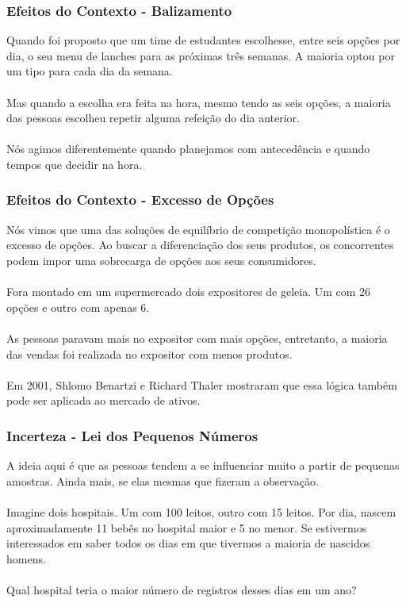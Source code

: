 \documentclass{beamer}[10]
\begin{document}
\begin{frame}
	\frametitle{Efeitos do Contexto - Balizamento}

	Quando foi proposto que um time de estudantes escolhesse, entre seis opções por dia, o seu menu de lanches para as próximas três semanas. A maioria optou por um tipo para cada dia da semana. 
	\\~\\
	Mas quando a escolha era feita na hora, mesmo tendo as seis opções, a maioria das pessoas escolheu repetir alguma refeição do dia anterior.
	\\~\\
	Nós agimos diferentemente quando planejamos com antecedência e quando tempos que decidir na hora.

\end{frame}

\begin{frame}
	\frametitle{Efeitos do Contexto - Excesso de Opções}

	Nós vimos que uma das soluções de equilíbrio de competição monopolística é o excesso de opções. Ao buscar a diferenciação dos seus produtos, os concorrentes podem impor uma sobrecarga de opções aos seus consumidores.
	\\~\\
	Fora montado em um supermercado dois expositores de geleia. Um com 26 opções e outro com apenas 6. 
	\\~\\
	As pessoas paravam mais no expositor com mais opções, entretanto, a maioria das vendas foi realizada no expositor com menos produtos. 
	\\~\\
	Em 2001, Shlomo Benartzi e Richard Thaler mostraram que essa lógica também pode ser aplicada ao mercado de ativos.

\end{frame}

\begin{frame}
	\frametitle{Incerteza - Lei dos Pequenos Números}

	A ideia aqui é que as pessoas tendem a se influenciar muito a partir de pequenas amostras. Ainda mais, se elas mesmas que fizeram a observação.
	\\~\\
	Imagine dois hospitais. Um com 100 leitos, outro com 15 leitos. Por dia, nascem aproximadamente 11 bebês no hospital maior e 5 no menor. Se estivermos interessados em saber todos os dias em que tivermos a maioria de nascidos homens. 
	\\~\\
	Qual hospital teria o maior número de registros desses dias em um ano?

\end{frame}
\end{document}
